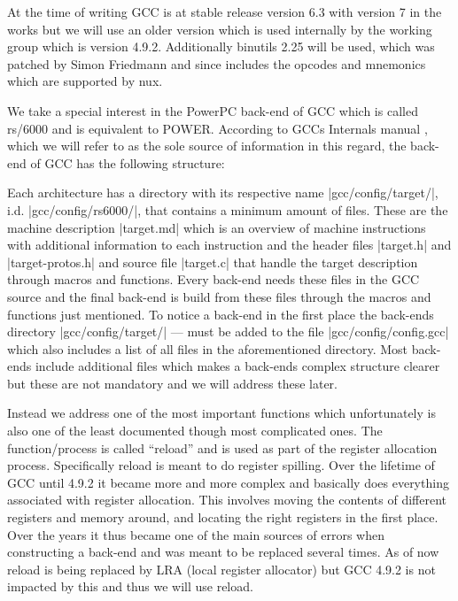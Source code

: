 {At the time of writing \ac{GCC} is at stable release version 6.3 with version 7 in the works but we will use an older version which is used internally by the working group which is version 4.9.2.
Additionally binutils 2.25 will be used, which was patched by Simon Friedmann and since includes the opcodes and mnemonics which are supported by nux.

We take a special interest in the PowerPC back-end of \ac{GCC} which is called \ac{rs/6000} and is equivalent to POWER.
According to \ac{GCC}s Internals manual \cite{GCCint}, which we will refer to as the sole source of information in this regard, the back-end of \ac{GCC} has the following structure:

Each architecture has a directory with its respective name |gcc/config/target/|, i.d. |gcc/config/rs6000/|, that contains a minimum amount of files.
These are the machine description |target.md| which is an overview of machine instructions with additional information to each instruction and the header files |target.h| and |target-protos.h| and source file |target.c| that handle the target description through macros and functions.
Every back-end needs these files in the \ac{GCC} source and the final back-end is build from these files through the macros and functions just mentioned.
To notice a back-end in the first place the back-ends directory |gcc/config/target/| --- must be added to the file |gcc/config/config.gcc| which also includes a list of all files in the aforementioned directory.
Most back-ends include additional files which makes a back-ends complex structure clearer but these are not mandatory and we will address these later.

Instead we address one of the most important functions which unfortunately is also one of the least documented though most complicated ones.
The function/process is called ``reload'' and is used as part of the register allocation process. \cite{GCCwiki:reload}
Specifically reload is meant to do register spilling.
Over the lifetime of \ac{GCC} until 4.9.2 it became more and more complex and basically does everything associated with register allocation.
This involves moving the contents of different registers and memory around, and locating the right registers in the first place.
Over the years it thus became one of the main sources of errors when constructing a back-end and was meant to be replaced several times.
As of now reload is being replaced by LRA (local register allocator) but \ac{GCC} 4.9.2 is not impacted by this and thus we will use reload.

}
